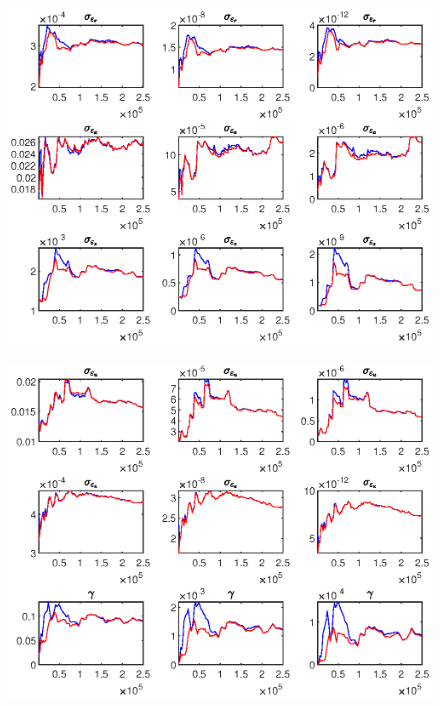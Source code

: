 \documentclass[11pt,preprint, authoryear]{elsarticle}
\let\origfigure\figure
\let\endorigfigure\endfigure
\renewenvironment{figure}[1][2] {
    \expandafter\origfigure\expandafter[H]
} {
    \endorigfigure
}
\numberwithin{equation}{section}
\numberwithin{figure}{section}
\numberwithin{table}{section}
\begin{document}
\begin{figure}
     \centering
     \begin{subfigure}[H]{0.49\textwidth}
         \centering
         \includegraphics[width=\textwidth]{code/mcmc_u1}
     \end{subfigure}
     \begin{subfigure}[H]{0.49\textwidth}
         \centering
         \includegraphics[width=\textwidth]{code/mcmc_u2}
     \end{subfigure}
    \begin{subfigure}[H]{0.49\textwidth}
         \centering

\end{subfigure}
\end{figure}
\end{document}
